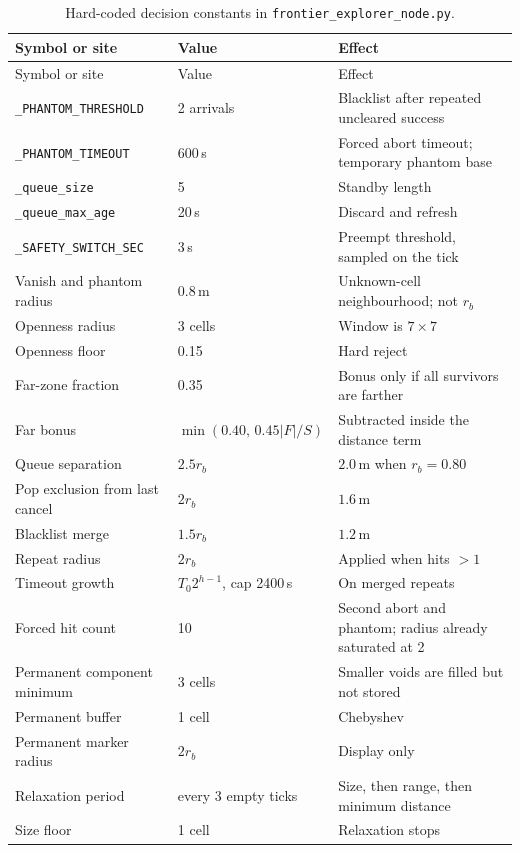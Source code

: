 \documentclass[11pt]{article}
\begin{document}
\begin{longtable}{@{}p{4.6cm}p{2.0cm}p{7.4cm}@{}}
\caption{Hard-coded decision constants in \texttt{frontier\_explorer\_node.py}.}\label{tab:hard}\\
\toprule
Symbol or site & Value & Effect \\
\midrule
\endfirsthead
\toprule
Symbol or site & Value & Effect \\
\midrule
\endhead
\texttt{\_PHANTOM\_THRESHOLD} & 2 arrivals & Blacklist after repeated uncleared success \\
\texttt{\_PHANTOM\_TIMEOUT} & 600\,s & Forced abort timeout; temporary phantom base \\
\texttt{\_queue\_size} & 5 & Standby length \\
\texttt{\_queue\_max\_age} & 20\,s & Discard and refresh \\
\texttt{\_SAFETY\_SWITCH\_SEC} & 3\,s & Preempt threshold, sampled on the tick \\
Vanish and phantom radius & 0.8\,m & Unknown-cell neighbourhood; not $r_b$ \\
Openness radius & 3 cells & Window is $7\times 7$ \\
Openness floor & 0.15 & Hard reject \\
Far-zone fraction & 0.35 & Bonus only if all survivors are farther \\
Far bonus & $\min(0.40,\,0.45|F|/S)$ & Subtracted inside the distance term \\
Queue separation & $2.5 r_b$ & $2.0$\,m when $r_b=0.80$ \\
Pop exclusion from last cancel & $2 r_b$ & $1.6$\,m \\
Blacklist merge & $1.5 r_b$ & $1.2$\,m \\
Repeat radius & $2 r_b$ & Applied when hits $>1$ \\
Timeout growth & $T_0 2^{h-1}$, cap 2400\,s & On merged repeats \\
Forced hit count & 10 & Second abort and phantom; radius already saturated at 2 \\
Permanent component minimum & 3 cells & Smaller voids are filled but not stored \\
Permanent buffer & 1 cell & Chebyshev \\
Permanent marker radius & $2 r_b$ & Display only \\
Relaxation period & every 3 empty ticks & Size, then range, then minimum distance \\
Size floor & 1 cell & Relaxation stops \\

\end{longtable}
\end{document}
